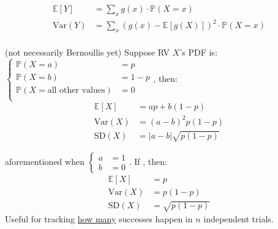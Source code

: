 \documentclass[10pt,landscape]{article}
\newcommand{\Red}[1]{\noindent{\textbf{\textcolor{BrickRed}{#1 -}}}}
\newcommand{\Green}[1]{\noindent{\textbf{\textcolor{PineGreen}{#1 -}}}}
\newcommand{\Hint}[1]{\noindent{\textcolor{Orange}{#1}}}
\begin{document}
\begin{multicols}{4}
\Red{Standard Deviation} 

\Green{Given $Y = g(X)$ and $X$'s PDF}
\begin{displaymath}
    \boxed{
        \begin{aligned}
            \mathbb{E}\left[Y\right] &= \sum_x g(x) \cdot \mathbb{P}(X = x) \\
            \text{Var}(Y) &= \sum_x \left(g(x) - \mathbb{E}\left[g(X)\right]\right)^2 \cdot \mathbb{P}(X = x) \\
        \end{aligned}
    }
\end{displaymath}

\Red{RVs with only 2 outcomes} (not necessarily Bernoullis yet)
Suppose RV $X$'s PDF is: $\begin{cases}
    \mathbb{P}(X = a) &= p \\
    \mathbb{P}(X = b) &= 1- p \\
    \mathbb{P}(X = \text{all other values}) &= 0 \\
\end{cases}$, then:
\begin{displaymath}
    \boxed{
        \begin{aligned}
            \mathbb{E}\left[X\right] &= ap + b(1-p) \\
            \text{Var}(X) &= (a-b)^2p(1-p) \\
            \text{SD}(X) &= |a-b| \sqrt{p (1-p)}
        \end{aligned}
    }
\end{displaymath}

\Red{Bernoulli Random Variable} aforementioned when $\begin{cases}
    a &= 1 \\
    b &= 0
\end{cases}$.
If , then:
\begin{displaymath}
    \boxed{
        \begin{aligned}
            \mathbb{E}\left[X\right] &= p \\
            \text{Var}(X) &= p(1-p) \\
            \text{SD}(X) &= \sqrt{p (1-p)}
        \end{aligned}
    }
\end{displaymath}
\Hint{
    \begin{itemize}
        \item Variance maximized when $p = 0.5$
        \item Variance minimized when $p = 0$ or $1$
    \end{itemize}
}
Useful for tracking \underline{how many} successes happen in $n$ independent trials.


\end{multicols}
\end{document}
